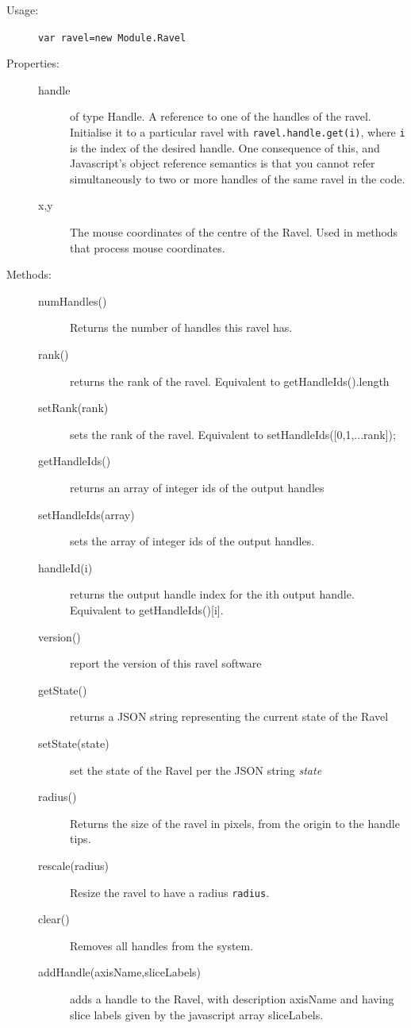 \documentclass{article}
\begin{document}
\begin{description}
\item[Usage:] \verb+var ravel=new Module.Ravel+
  
\item[Properties:]\mbox{}
  \begin{description}
  \item[handle] of type Handle. A reference to one of the handles of the
    ravel. Initialise it to a particular ravel with
    \verb+ravel.handle.get(i)+, where \verb+i+ is the index of the desired
    handle. One consequence of this, and Javascript's object reference
    semantics is that you cannot refer simultaneously to two or more
    handles of the same ravel in the code.
  \item[x,y] The mouse coordinates of the centre of the Ravel. Used in
    methods that process mouse coordinates.
  \end{description}
  
\item[Methods:]\mbox{}
  \begin{description}
  \item[numHandles()] Returns the number of handles this ravel has.
  \item[rank()] returns the rank of the ravel. Equivalent to getHandleIds().length
  \item[setRank(rank)] sets the rank of the ravel. Equivalent to
    setHandleIds([0,1,...rank]);
  \item[getHandleIds()] returns an array of integer ids of the output handles
  \item[setHandleIds(array)] sets the array of integer ids of the output
    handles.
  \item[handleId(i)] returns the output handle index for the ith output
    handle. Equivalent to getHandleIds()[i].
  \item[version()] report the version of this ravel software
  \item[getState()] returns a JSON string representing the current
    state of the Ravel
  \item[setState(state)] set the state of the Ravel per the JSON
    string {\em state}  
  \item[radius()] Returns the size of the ravel in pixels, from the origin
    to the handle tips.
  \item[rescale(radius)] Resize the ravel to have a radius {\tt radius}.
    
  \item[clear()] Removes all handles from the system.
  \item[addHandle(axisName,sliceLabels)] adds a handle to the Ravel,
    with description axisName and having slice labels given by the
    javascript array  sliceLabels.
    

\end{description}
\end{description}
\end{document}
